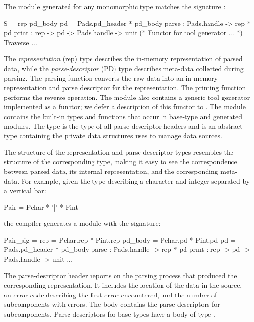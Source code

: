 The module generated for any monomorphic \padsml{} type 
matches the signature :
\begin{code}\scriptsize
{}  S = 
   rep
   pd\_body
   pd = Pads.pd_header * pd_body
    parse : Pads.handle -> rep * pd
    print : rep -> pd -> Pads.handle -> unit
  (* Functor for tool generator ... *)
   Traverse ...
\end{code}%
\noindent 
The \emph{representation} (rep) type describes the
in-memory representation of parsed data, while the
\emph{parse-descriptor} (PD) type describes meta-data collected
during parsing.
The parsing function converts the raw data into an in-memory
representation and parse descriptor for the representation.
The printing function performs the reverse operation.
The module also contains a generic tool generator implemented as a functor; we defer a description of this functor to .
The module  contains the
built-in types and functions that occur in base-type and generated
modules.  The type  is the type of all parse-descriptor
headers and  is an abstract type containing the
private data structures \padsml{} uses to manage data sources.

The structure of the representation and parse-descriptor types
resembles the structure of the corresponding \padsml{} type, making it
easy to see the correspondence between parsed data, its internal
representation, and the corresponding meta-data.  
For example, given the \padsml{} type  describing a character
and integer separated by a vertical bar:
\begin{code}\scriptsize
   Pair = Pchar * '|' * Pint\end{code}%
the compiler generates a module with the signature:
\begin{code}\scriptsize
{}  Pair_sig = 
   rep     = Pchar.rep * Pint.rep
   pd_body = Pchar.pd  * Pint.pd
   pd      = Pads.pd_header * pd_body
    parse   : Pads.handle -> rep * pd
    print   : rep -> pd -> Pads.handle -> unit
  ...
\end{code}%
\noindent 
The parse-descriptor header reports on the parsing
process that produced the corresponding representation.  It includes
the location of the data in the source, an error code
describing the first error encountered, and the number of
subcomponents with errors.  The body contains the parse
descriptors for subcomponents.
Parse descriptors for base types have a body of type .

